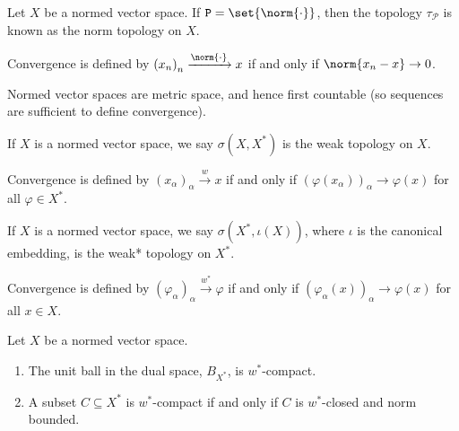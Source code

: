 \begin{definition}\label{def:norm_topology}
  Let $X$ be a normed vector space. If $\mathcal{P} = \set{\norm{\cdot}}$, then the topology $\tau_{\mathcal{P}}$ is known as the norm topology on $X$.\newline

  Convergence is defined by $\left(x_n\right)_n\xrightarrow{\norm{\cdot}}x$ if and only if $\norm{x_n - x}\rightarrow 0$.
\end{definition}
\begin{remark}
  Normed vector spaces are metric space, and hence first countable (so sequences are sufficient to define convergence).
\end{remark}
\begin{definition}\label{def:weak_topology}
  If $X$ is a normed vector space, we say $\sigma\left(X,X^{\ast}\right)$ is the weak topology on $X$.\newline

  Convergence is defined by $\left(x_\alpha\right)_\alpha\xrightarrow{w}x$ if and only if $\left(\varphi\left(x_\alpha\right)\right)_\alpha\rightarrow \varphi\left(x\right)$ for all $\varphi\in X^{\ast}$.
\end{definition}
\begin{definition}\label{def:weak_star_topology}
  If $X$ is a normed vector space, we say $\sigma\left(X^{\ast},\iota(X)\right)$, where $\iota$ is the canonical embedding, is the weak* topology on $X^{\ast}$.\newline

  Convergence is defined by $\left(\varphi_{\alpha}\right)_\alpha\xrightarrow{w^{\ast}} \varphi$ if and only if $\left(\varphi_{\alpha}(x)\right)_{\alpha}\rightarrow \varphi(x)$ for all $x\in X$.
\end{definition}
\begin{theorem}\label{thm:banach_alaoglu}
  Let $X$ be a normed vector space. 
  \begin{enumerate}[(1)]
    \item The unit ball in the dual space, $B_{X^{\ast}}$, is $w^{\ast}$-compact.
    \item A subset $C\subseteq X^{\ast}$ is $w^{\ast}$-compact if and only if $C$ is $w^{\ast}$-closed and norm bounded.
  \end{enumerate}
\end{theorem}
